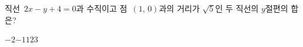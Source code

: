 직선~$2x-y+4=0$과 수직이고 점~$(1,\,0)$과의 거리가 $\sqrt{5}$인 두 직선의 $y$절편의 합은?
\begin{choices32}{$-2$}{$-1$}{$1$}{$2$}{$3$}\end{choices32}
